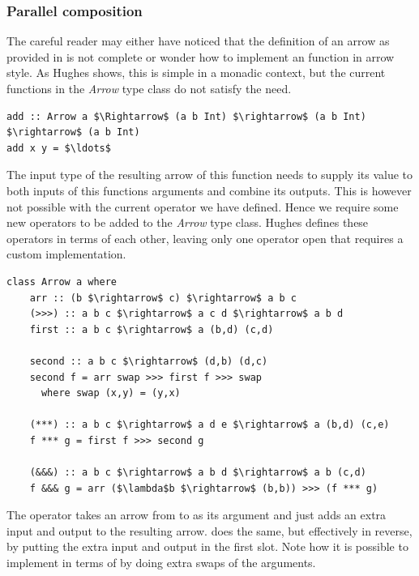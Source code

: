 \subsubsection{Parallel composition}
The careful reader may either have noticed that the definition of an arrow as provided in  is not complete or wonder how to implement an  function in arrow style. As Hughes shows, this is simple in a monadic context, but the current functions in the \textit{Arrow} type class do not satisfy the need.

\begin{lstlisting}[style=InlineHaskellStyle]
add :: Arrow a $\Rightarrow$ (a b Int) $\rightarrow$ (a b Int) $\rightarrow$ (a b Int)
add x y = $\ldots$
\end{lstlisting}

The input type  of the resulting arrow of this function needs to supply its value to both inputs of this functions arguments and combine its outputs. This is however not possible with the current \code{(>>>)} operator we have defined. Hence we require some new operators to be added to the \textit{Arrow} type class. Hughes defines these operators in terms of each other, leaving only one operator open that requires a custom implementation.

\begin{minipage}{\linewidth}
\begin{lstlisting}[style=HaskellStyle, caption={\textit{Arrow} type class}, label={lst:arrow-typeclass-full}]
class Arrow a where
    arr :: (b $\rightarrow$ c) $\rightarrow$ a b c
    (>>>) :: a b c $\rightarrow$ a c d $\rightarrow$ a b d
    first :: a b c $\rightarrow$ a (b,d) (c,d)
    
    second :: a b c $\rightarrow$ (d,b) (d,c)
    second f = arr swap >>> first f >>> swap
      where swap (x,y) = (y,x)
      
    (***) :: a b c $\rightarrow$ a d e $\rightarrow$ a (b,d) (c,e)
    f *** g = first f >>> second g
    
    (&&&) :: a b c $\rightarrow$ a b d $\rightarrow$ a b (c,d)
    f &&& g = arr ($\lambda$b $\rightarrow$ (b,b)) >>> (f *** g)
\end{lstlisting}
\end{minipage}

The operator  takes an arrow from  to  as its argument and just adds an extra input and output to the resulting arrow.  does the same, but effectively in reverse, by putting the extra input and output in the first slot. Note how it is possible to implement  in terms of  by doing extra swaps of the arguments.

